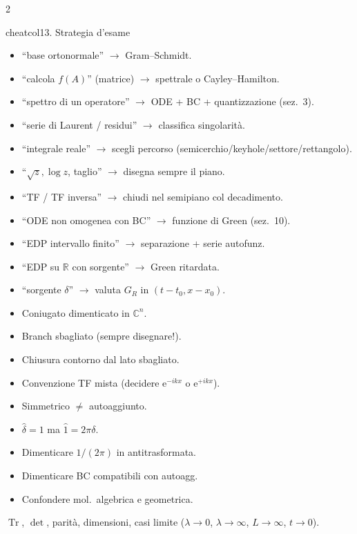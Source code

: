 \documentclass[10pt,a4paper]{article}
\newcommand{\R}{\mathbb{R}}
\newcommand{\C}{\mathbb{C}}
\newcommand{\eu}{\mathrm{e}}
\DeclareMathOperator{\Tr}{Tr}
\begin{document}
\begin{multicols}{2}
\begin{secbox}{cheatcol}{13. Strategia d'esame}

\begin{itemize}
\item ``base ortonormale'' $\to$ Gram--Schmidt.
\item ``calcola $f(A)$'' (matrice) $\to$ spettrale o Cayley--Hamilton.
\item ``spettro di un operatore'' $\to$ ODE + BC + quantizzazione (sez.\ 3).
\item ``serie di Laurent / residui'' $\to$ classifica singolarità.
\item ``integrale reale'' $\to$ scegli percorso (semicerchio/keyhole/settore/rettangolo).
\item ``$\sqrt z, \log z$, taglio'' $\to$ disegna sempre il piano.
\item ``TF / TF inversa'' $\to$ chiudi nel semipiano col decadimento.
\item ``ODE non omogenea con BC'' $\to$ funzione di Green (sez.\ 10).
\item ``EDP intervallo finito'' $\to$ separazione + serie autofunz.
\item ``EDP su $\R$ con sorgente'' $\to$ Green ritardata.
\item ``sorgente $\delta$'' $\to$ valuta $G_R$ in $(t-t_0,x-x_0)$.
\end{itemize}

\begin{itemize}
\item Coniugato dimenticato in $\C^n$.
\item Branch sbagliato (sempre disegnare!).
\item Chiusura contorno dal lato sbagliato.
\item Convenzione TF mista (decidere $\eu^{-ikx}$ o $\eu^{+ikx}$).
\item Simmetrico $\neq$ autoaggiunto.
\item $\hat\delta=1$ ma $\hat 1=2\pi\delta$.
\item Dimenticare $1/(2\pi)$ in antitrasformata.
\item Dimenticare BC compatibili con autoagg.
\item Confondere mol.\ algebrica e geometrica.
\end{itemize}

$\Tr$, $\det$, parità, dimensioni, casi limite ($\lambda\to 0$, $\lambda\to\infty$, $L\to\infty$, $t\to 0$).


\end{secbox}
\end{multicols}
\end{document}
